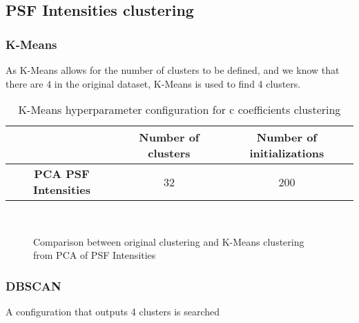 	\subsection{PSF Intensities clustering}

		\subsubsection{K-Means}
			
			As K-Means allows for the number of clusters to be defined, and we know that there are 4 in the original dataset, K-Means is used to find 4 clusters.
			
			\begin{table}[h!]
				\centering
				\begin{tabular}{|c|c|c|}
					\hline
					& \textbf{Number of clusters} & \textbf{Number of initializations}\\
					\hline
					\textbf{PCA PSF Intensities} & 32 & 200\\
					\hline
				\end{tabular}
				\caption{K-Means hyperparameter configuration for c coefficients clustering}
			\end{table}
		
			\begin{figure*}[ht!]
				\centering
				\hspace{\fill}
				\\
					
				\hspace{\fill}
				\caption{Comparison between original clustering and K-Means clustering from PCA of PSF Intensities}
			\end{figure*}
			\FloatBarrier
		
		\subsubsection{DBSCAN}
			
			A configuration that outputs 4 clusters is searched
			
